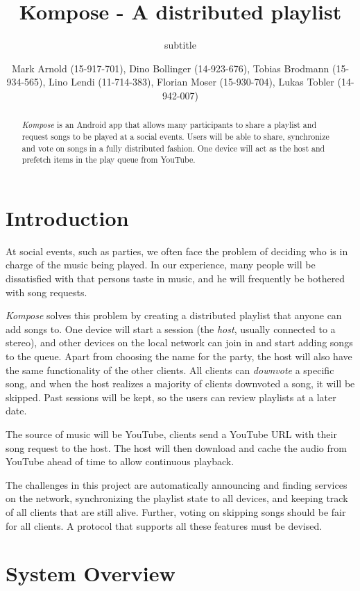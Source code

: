 \documentclass{report}
\title{Kompose - A distributed playlist}
\subtitle{subtitle}
\author{
%
%
    \alignauthor \normalsize{Mark Arnold (15-917-701), Dino Bollinger (14-923-676), Tobias Brodmann (15-934-565), Lino Lendi (11-714-383), Florian Moser (15-930-704), Lukas Tobler (14-942-007)}\\
	\email{\normalsize{arnomark@student.ethz.ch, bdino@student.ethz.ch, brotobia@student.ethz.ch, llendi@student.ethz.ch, moserfl@studen.ethz.ch, lutobler@student.ethz.ch}}
}
\begin{document}
\maketitle

\begin{abstract}
\emph{Kompose} is an Android app that allows many participants to share a playlist and
request songs to be played at a social events. Users will be able to share,
synchronize and vote on songs in a fully distributed fashion. One device will
act as the host and prefetch items in the play queue from YouTube.
\end{abstract}

\section{Introduction}
At social events, such as parties, we often face the problem of deciding who is
in charge of the music being played. In our experience, many people will be
dissatisfied with that persons taste in music, and he will frequently be
bothered with song requests.

\emph{Kompose} solves this problem by creating a distributed playlist that anyone
can add songs to. One device will start a session (the \emph{host}, usually connected
to a stereo), and other devices on the local network can join in and start
adding songs to the queue.  Apart from choosing the name for the party,
the host will also have the same functionality of the other clients.
All clients can \emph{downvote} a specific song, and when the host realizes
a majority of clients downvoted a song, it will be skipped.  Past sessions
will be kept, so the users can review playlists at a later date.

The source of music will be YouTube, clients send a YouTube URL with
their song request to the host. The host will then download and cache the
audio from YouTube ahead of time to allow continuous playback.

The challenges in this project are automatically announcing and finding
services on the network, synchronizing the playlist state to all devices,
and keeping track of all clients that are still alive. Further, voting on
skipping songs should be fair for all clients. A protocol that supports all
these features must be devised.

\section{System Overview}
\end{document}

